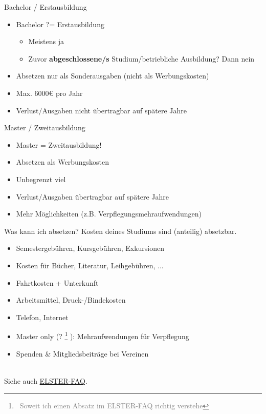 \documentclass[draft]{beamer}
\newcommand{\n}{\hfill\\\vspace{0.25cm}}
\let\oldfootnote\footnote
\renewcommand{\footnote}[1]
{%
	\oldfootnote
	{
		\tiny
		\textcolor{gray}{\ #1}
	}%
}
\begin{document}
		\begin{frame}{Bachelor / Erstausbildung}
			\begin{itemize}
				\item Bachelor ?= Erstausbildung
				\begin{itemize}
					\item Meistens ja
					\item Zuvor \textbf{abgeschlossene/s} Studium/betriebliche Ausbildung? Dann nein
				\end{itemize}
				\item Absetzen nur als Sonderausgaben (nicht als Werbungskosten)
				\item Max. 6000€ pro Jahr
				\item Verlust/Ausgaben nicht übertragbar auf spätere Jahre
			\end{itemize}
		\end{frame}
	
		\begin{frame}{Master / Zweitausbildung}
			\begin{itemize}
				\item Master = Zweitausbildung!
				\item Absetzen als Werbungskosten
				\item Unbegrenzt viel
				\item Verlust/Ausgaben übertragbar auf spätere Jahre
				\item Mehr Möglichkeiten (z.B. Verpflegungsmehraufwendungen)
			\end{itemize}
		\end{frame}
	
		\begin{frame}{Was kann ich absetzen?}
			Kosten deines Studiums sind (anteilig) absetzbar.\n
			\begin{itemize}
				\item Semestergebühren, Kursgebühren, Exkursionen
				\item Kosten für Bücher, Literatur, Leihgebühren, ...
				\item Fahrtkosten + Unterkunft
				\item Arbeitsmittel, Druck-/Bindekosten
				\item Telefon, Internet
				\item Master only (?\footnote{Soweit ich einen Absatz im ELSTER-FAQ richtig verstehe}): Mehraufwendungen für Verpflegung
				\item Spenden \& Mitgliedsbeiträge bei Vereinen
			\end{itemize}\n
			Siehe auch \href{https://www.elster.de/eportal/helpGlobal?themaGlobal=help_est_ufa_10_2020}{ELSTER-FAQ}.
		\end{frame}
	
\end{document}
